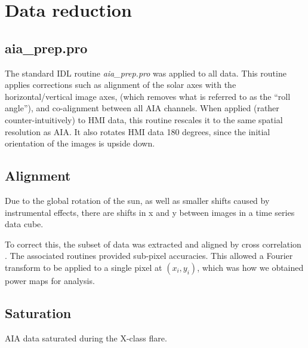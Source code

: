 
\clearpage


\section{Data reduction}

\subsection{aia\_prep.pro}

The standard IDL routine \textit{aia\_prep.pro} was applied to all data.
This routine applies corrections such as
alignment of the solar axes with the horizontal/vertical image axes,
(which removes what is referred to as the ``roll angle''),
and co-alignment between all AIA channels.
When applied (rather counter-intuitively)
to HMI data, this routine rescales it to the same spatial resolution as AIA.
It also rotates HMI data 180 degrees, since the initial orientation
of the images is upside down.




\subsection{Alignment}

Due to the global rotation of the sun, as well as smaller shifts caused
by instrumental effects, there are shifts in x and y between
images in a time series data cube.

To correct this,
the subset of data was extracted and aligned by cross correlation
\citep{McAteer2003, McAteer2004}.
The associated routines provided sub-pixel accuracies.
This allowed a Fourier transform to be applied to a single pixel
at $(x_{i}, y_{i})$, which was how we obtained power maps for analysis.



\subsection{Saturation}


AIA data saturated during the X-class flare.
